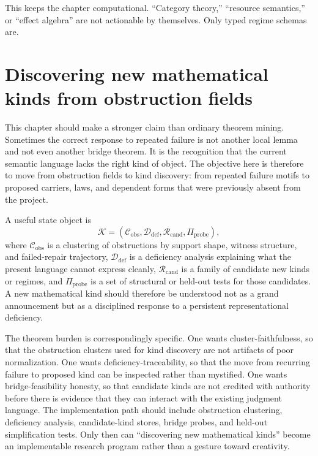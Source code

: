 \documentclass[11pt]{report}
\begin{document}
This keeps the chapter computational. “Category theory,” “resource semantics,” or “effect algebra” are not actionable by themselves. Only typed regime schemas are.

\chapter{Discovering new mathematical kinds from obstruction fields}
This chapter should make a stronger claim than ordinary theorem mining. Sometimes the correct response to repeated failure is not another local lemma and not even another bridge theorem. It is the recognition that the current semantic language lacks the right kind of object. The objective here is therefore to move from obstruction fields to kind discovery: from repeated failure motifs to proposed carriers, laws, and dependent forms that were previously absent from the project.

A useful state object is
\[
\mathcal{K} = (\mathcal{C}_{\mathrm{obs}}, \mathcal{D}_{\mathrm{def}}, \mathcal{R}_{\mathrm{cand}}, \Pi_{\mathrm{probe}}),
\]
where $\mathcal{C}_{\mathrm{obs}}$ is a clustering of obstructions by support shape, witness structure, and failed-repair trajectory, $\mathcal{D}_{\mathrm{def}}$ is a deficiency analysis explaining what the present language cannot express cleanly, $\mathcal{R}_{\mathrm{cand}}$ is a family of candidate new kinds or regimes, and $\Pi_{\mathrm{probe}}$ is a set of structural or held-out tests for those candidates. A new mathematical kind should therefore be understood not as a grand announcement but as a disciplined response to a persistent representational deficiency.

The theorem burden is correspondingly specific. One wants cluster-faithfulness, so that the obstruction clusters used for kind discovery are not artifacts of poor normalization. One wants deficiency-traceability, so that the move from recurring failure to proposed kind can be inspected rather than mystified. One wants bridge-feasibility honesty, so that candidate kinds are not credited with authority before there is evidence that they can interact with the existing judgment language. The implementation path should include obstruction clustering, deficiency analysis, candidate-kind stores, bridge probes, and held-out simplification tests. Only then can ``discovering new mathematical kinds'' become an implementable research program rather than a gesture toward creativity.
\end{document}
